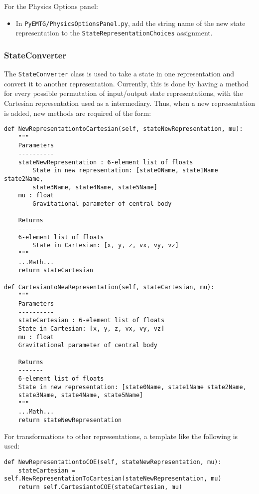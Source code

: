 \documentclass[11pt]{article}
\begin{document}
For the Physics Options panel:

\begin{itemize}
	\item In \texttt{PyEMTG/PhysicsOptionsPanel.py}, add the string name of the new state representation to the \texttt{StateRepresentationChoices} assignment.
\end{itemize}

\subsubsection{StateConverter}
\label{subsubsec:stateConverter}

The \texttt{StateConverter} class is used to take a state in one representation and convert it to another representation. Currently, this is done by having a method for every possible permutation of input/output state representations, with the Cartesian representation used as a intermediary. Thus, when a new representation is added, new methods are required of the form:

\begin{verbatim}
def NewRepresentationtoCartesian(self, stateNewRepresentation, mu):
	"""
	Parameters
	----------
	stateNewRepresentation : 6-element list of floats
		State in new representation: [state0Name, state1Name state2Name, 
		state3Name, state4Name, state5Name]
	mu : float
		Gravitational parameter of central body
	
	Returns
	-------
	6-element list of floats
		State in Cartesian: [x, y, z, vx, vy, vz]
	"""
	...Math...
	return stateCartesian
	
def CartesiantoNewRepresentation(self, stateCartesian, mu):
	"""
	Parameters
	----------
	stateCartesian : 6-element list of floats
	State in Cartesian: [x, y, z, vx, vy, vz]
	mu : float
	Gravitational parameter of central body
	
	Returns
	-------
	6-element list of floats
	State in new representation: [state0Name, state1Name state2Name, 
	state3Name, state4Name, state5Name]
	"""
	...Math...
	return stateNewRepresentation
\end{verbatim}

For transformations to other representations, a template like the following is used:

\begin{verbatim}
def NewRepresentationtoCOE(self, stateNewRepresentation, mu):
	stateCartesian = self.NewRepresentationToCartesian(stateNewRepresentation, mu)
	return self.CartesiantoCOE(stateCartesian, mu)
\end{verbatim}
\end{document}
